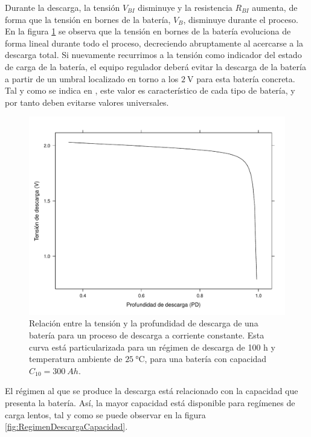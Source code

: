 Durante la descarga, la tensión $V_{BI}$ disminuye y la resistencia
$R_{BI}$ aumenta, de forma que la tensión en bornes de la batería,
$V_{B}$, disminuye durante el proceso. En la figura \ref{fig:CurvaDescarga}
se observa que la tensión en bornes de la batería evoluciona de forma
lineal durante todo el proceso, decreciendo abruptamente al acercarse
a la descarga total. Si nuevamente recurrimos a la tensión como indicador
del estado de carga de la batería, el equipo regulador deberá evitar
la descarga de la batería a partir de un umbral localizado en torno
a los $\SI{2}{\volt}$ para esta batería concreta. Tal y como se indica
en \cite{Egido.Lorenzo1998}, este valor es característico de cada
tipo de batería, y por tanto deben evitarse valores universales.

%
\begin{figure}
\includegraphics[scale=0.6]{../figs/Bateria_SOCyDescarga}

\caption[Relación entre la tensión y la profundidad de descarga de una batería
para un proceso de descarga a corriente constante]{\label{fig:CurvaDescarga}Relación entre la tensión y la profundidad
de descarga de una batería para un proceso de descarga a corriente
constante. Esta curva está particularizada para un régimen de descarga
de 100 h y temperatura ambiente de $\SI{25}{\celsius}$, para una
batería con capacidad $C_{10}=\SI{300}{Ah}$.}



\end{figure}


El régimen al que se produce la descarga está relacionado con la capacidad
que presenta la batería. Así, la mayor capacidad está disponible para
regímenes de carga lentos, tal y como se puede observar en la figura
\ref{fig:RegimenDescargaCapacidad}.

